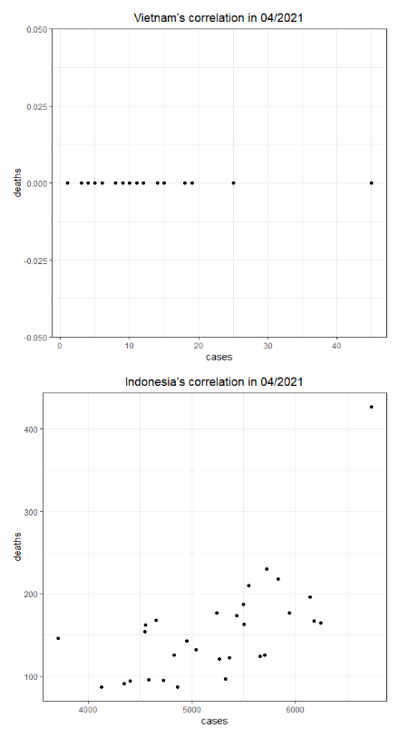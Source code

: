 \documentclass[a4paper]{article}
\theoremstyle{definition}
\begin{document}
\begin{enumerate}[1)]
\begin{figure}[H]
\begin{center}
        \includegraphics[scale = 0.3]{ix/ix.2/VN_04_2021.png}
        \includegraphics[scale = 0.3]{ix/ix.2/IDN_04_2021.png}

\end{center}
\end{figure}
\end{enumerate}
\end{document}
